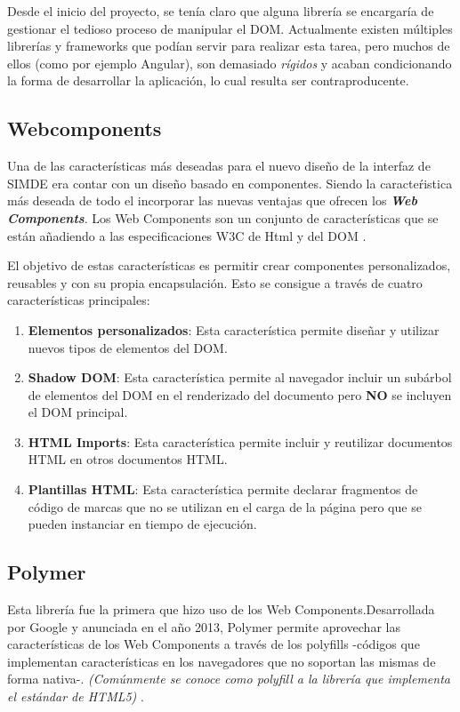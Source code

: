 Desde el inicio del proyecto, se tenía claro que alguna librería se encargaría de gestionar
 el tedioso proceso de manipular el DOM. Actualmente existen múltiples librerías 
y frameworks que podían servir para realizar esta tarea, pero muchos de ellos (como por ejemplo Angular),
son demasiado \textit{rígidos} y acaban condicionando la forma de desarrollar la aplicación, 
lo cual resulta ser contraproducente.

\subsection{Webcomponents}

\bigskip
Una de las características más deseadas para el nuevo diseño de la interfaz de SIMDE era contar con
un diseño basado en componentes. Siendo la caracteŕistica más deseada de todo el incorporar las nuevas 
ventajas que ofrecen los \textit\textbf{Web Components}. Los Web Components son un conjunto de 
características que se están añadiendo a las especificaciones W3C de Html y del DOM \cite{Webcomponents}. 

\bigskip 
El objetivo de estas características es permitir crear componentes personalizados, reusables y 
con su propia encapsulación. Esto se consigue a través de cuatro características principales:

\begin{enumerate}

\item \textbf{Elementos personalizados}: Esta característica permite diseñar y utilizar nuevos tipos 
de elementos del DOM.
\item \textbf{Shadow DOM}: Esta característica permite al navegador incluir un subárbol de elementos del 
DOM en el renderizado del documento pero \textbf{NO} se incluyen el DOM principal.
\item \textbf{HTML Imports}: Esta característica permite incluir y reutilizar documentos HTML en otros 
documentos HTML.
\item \textbf{Plantillas HTML}: Esta característica permite declarar fragmentos de código de marcas que no
se utilizan en el carga de la página pero que se pueden instanciar en tiempo de ejecución. 

\end{enumerate}

\subsection{Polymer}
Esta librería fue la primera que hizo uso de los Web Components.Desarrollada por Google y anunciada en 
el año 2013, Polymer permite aprovechar las características de los Web Components \cite{Polymer} a través de los polyfills 
-códigos que implementan características en los navegadores que no soportan las mismas de forma nativa-.
\textit{(Comúnmente se conoce como polyfill a la librería que implementa el estándar de HTML5)} \cite{Polyfill}.  


